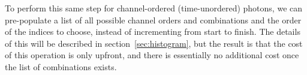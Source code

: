 \documentclass{article}
\newcommand{\braces}[1]{\ensuremath{\left\lbrace #1 \right\rbrace}}
\newcommand{\angles}[1]{\ensuremath{\left\langle #1 \right\rangle}}
\newcommand{\intensity}{\texttt{intensity}}
\newcommand{\gn}[1]{\ensuremath{g^{(#1)}}}
\begin{document}
To perform this same step for channel-ordered (time-unordered) photons, we can pre-populate a list of all possible channel orders and combinations and the order of the indices to choose, instead of incrementing from start to finish. The details of this will be described in section~\ref{sec:histogram}, but the result is that the cost of this operation is only upfront, and there is essentially no additional cost once the list of combinations exists.

%
\end{document}

